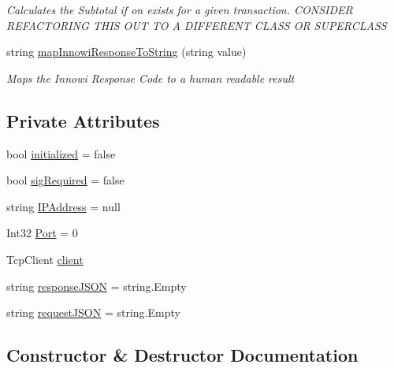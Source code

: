 \begin{DoxyCompactItemize}
\begin{DoxyCompactList}\small\item\em Calculates the Subtotal if on exists for a given transaction. C\+O\+N\+S\+I\+D\+ER R\+E\+F\+A\+C\+T\+O\+R\+I\+NG T\+H\+IS O\+UT TO A D\+I\+F\+F\+E\+R\+E\+NT C\+L\+A\+SS OR S\+U\+P\+E\+R\+C\+L\+A\+SS \end{DoxyCompactList}\item 
string \mbox{\hyperlink{class_cert_complete_1_1_innowi_device_ae127b1812832513a8e5763df33bed803}{map\+Innowi\+Response\+To\+String}} (string value)
\begin{DoxyCompactList}\small\item\em Maps the Innowi Response Code to a human readable result \end{DoxyCompactList}\end{DoxyCompactItemize}
\subsection*{Private Attributes}
\begin{DoxyCompactItemize}
\item 
bool \mbox{\hyperlink{class_cert_complete_1_1_innowi_device_afef9b74bd03eaeaf3911d5a8640c1c15}{initialized}} = false
\item 
bool \mbox{\hyperlink{class_cert_complete_1_1_innowi_device_aee573efa3c2a5c86451d408ccb53900d}{sig\+Required}} = false
\item 
string \mbox{\hyperlink{class_cert_complete_1_1_innowi_device_a6c49617cdcaf95aab72cf409943fe9c1}{I\+P\+Address}} = null
\item 
Int32 \mbox{\hyperlink{class_cert_complete_1_1_innowi_device_a1b640eb99fdebc43553d71b0c9c5d646}{Port}} = 0
\item 
Tcp\+Client \mbox{\hyperlink{class_cert_complete_1_1_innowi_device_a4adf7808e8911c0f055f8916dab3b8ee}{client}}
\item 
string \mbox{\hyperlink{class_cert_complete_1_1_innowi_device_a277880cdbb944699ba2e9e0c9269ea23}{response\+J\+S\+ON}} = string.\+Empty
\item 
string \mbox{\hyperlink{class_cert_complete_1_1_innowi_device_a035bea2cd952dc08557d7abf7e25af27}{request\+J\+S\+ON}} = string.\+Empty
\end{DoxyCompactItemize}


\subsection{Constructor \& Destructor Documentation}
\mbox{\label{class_cert_complete_1_1_innowi_device_ad5c2b124be7515bd8973c53400629367}} 
